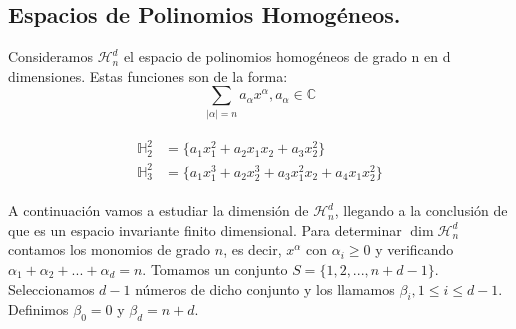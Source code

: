 \subsection{Espacios de Polinomios Homogéneos.}
Consideramos $\mathcal{H}^d_n$ el espacio de polinomios homogéneos de grado n en d dimensiones. Estas funciones son de la forma:
$$
\sum_{|\alpha|=n}a_\alpha x^\alpha, a_\alpha \in \mathds{C}
$$
\begin{example}
	\begin{gather*}
	\begin{aligned}
		\mathds{H}^2_2 &= \{ a_1x_1^2 + a_2x_1x_2 + a_3x_2^2\} \\
		\mathds{H}^2_3 &= \{ a_1x_1^3 + a_2x_2^3 + a_3x_1^2x_2 + a_4x_1x_2^2 \}
	\end{aligned}
	\end{gather*}
\end{example}
\medskip
A continuación vamos a estudiar la dimensión de  $\mathcal{H}^d_n$, llegando a la conclusión de que es un espacio invariante finito dimensional.
Para determinar $\dim \mathcal{H}^d_n$ contamos los monomios de grado $n$, es decir, $x^\alpha$ con $\alpha_i \ge 0$ y verificando $\alpha_1 + \alpha_2 + ... + \alpha_d = n$. Tomamos un conjunto $S=\{1,2,...,n+d-1\}$. Seleccionamos $d-1$ números de dicho conjunto y los llamamos $\beta_i, 1\leq i \leq d-1$. Definimos  $\beta_0 = 0 $ y $\beta_d = n+d$.

